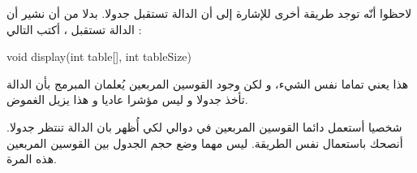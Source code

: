 لاحظوا أنّه توجد طريقة أخرى للإشارة إلى أن الدالة تستقبل جدولا. بدلا من أن نشير أن الدالة تستقبل
،
أكتب التالي :
\begin{Csource}
void display(int table[], int tableSize)
\end{Csource}
هذا يعني تماما نفس الشيء، و لكن وجود القوسين المربعين يُعلمان المبرمج بأن الدالة تأخذ جدولا و ليس مؤشرا عاديا و هذا يزيل الغموض.

شخصيا أستعمل دائما القوسين المربعين في دوالي لكي أُظهر بان الدالة تنتظر جدولا. أنصحك باستعمال نفس الطريقة. ليس مهما وضع حجم الجدول بين القوسين المربعين هذه المرة.
